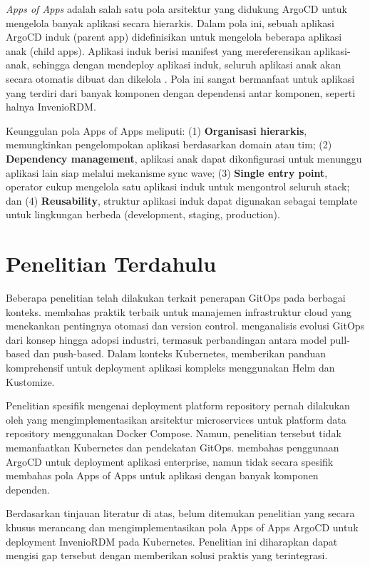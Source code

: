 \textit{Apps of Apps} adalah salah satu pola arsitektur yang didukung ArgoCD untuk mengelola banyak aplikasi secara hierarkis. Dalam pola ini, sebuah aplikasi ArgoCD induk (parent app) didefinisikan untuk mengelola beberapa aplikasi anak (child apps). Aplikasi induk berisi manifest yang mereferensikan aplikasi-anak, sehingga dengan mendeploy aplikasi induk, seluruh aplikasi anak akan secara otomatis dibuat dan dikelola \citep{argocd2024}. Pola ini sangat bermanfaat untuk aplikasi yang terdiri dari banyak komponen dengan dependensi antar komponen, seperti halnya InvenioRDM.

Keunggulan pola Apps of Apps meliputi: (1) \textbf{Organisasi hierarkis}, memungkinkan pengelompokan aplikasi berdasarkan domain atau tim; (2) \textbf{Dependency management}, aplikasi anak dapat dikonfigurasi untuk menunggu aplikasi lain siap melalui mekanisme sync wave; (3) \textbf{Single entry point}, operator cukup mengelola satu aplikasi induk untuk mengontrol seluruh stack; dan (4) \textbf{Reusability}, struktur aplikasi induk dapat digunakan sebagai template untuk lingkungan berbeda (development, staging, production).

\section{Penelitian Terdahulu}

Beberapa penelitian telah dilakukan terkait penerapan GitOps pada berbagai konteks. \citep{limoncelli2018} membahas praktik terbaik untuk manajemen infrastruktur cloud yang menekankan pentingnya otomasi dan version control. \citep{gitops2023} menganalisis evolusi GitOps dari konsep hingga adopsi industri, termasuk perbandingan antara model pull-based dan push-based. Dalam konteks Kubernetes, \citep{kubernetes2024} memberikan panduan komprehensif untuk deployment aplikasi kompleks menggunakan Helm dan Kustomize.

Penelitian spesifik mengenai deployment platform repository pernah dilakukan oleh \citep{zhang2022} yang mengimplementasikan arsitektur microservices untuk platform data repository menggunakan Docker Compose. Namun, penelitian tersebut tidak memanfaatkan Kubernetes dan pendekatan GitOps. \citep{wang2021} membahas penggunaan ArgoCD untuk deployment aplikasi enterprise, namun tidak secara spesifik membahas pola Apps of Apps untuk aplikasi dengan banyak komponen dependen.

Berdasarkan tinjauan literatur di atas, belum ditemukan penelitian yang secara khusus merancang dan mengimplementasikan pola Apps of Apps ArgoCD untuk deployment InvenioRDM pada Kubernetes. Penelitian ini diharapkan dapat mengisi gap tersebut dengan memberikan solusi praktis yang terintegrasi.

